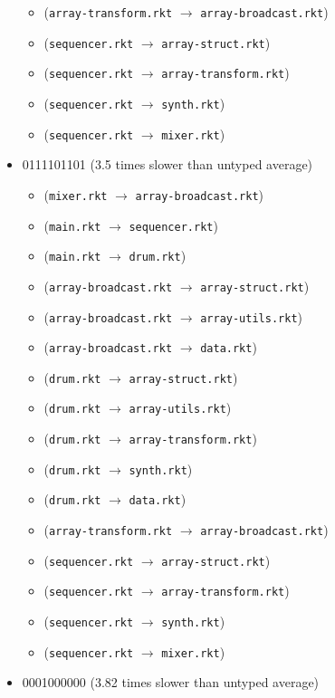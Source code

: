 \documentclass{article}
\newcommand{\mono}[1]{\texttt{#1}}
\begin{document}
\begin{itemize}
\begin{itemize}
  \item (\mono{array-transform.rkt} $\rightarrow$ \mono{array-broadcast.rkt})
  \item (\mono{sequencer.rkt} $\rightarrow$ \mono{array-struct.rkt})
  \item (\mono{sequencer.rkt} $\rightarrow$ \mono{array-transform.rkt})
  \item (\mono{sequencer.rkt} $\rightarrow$ \mono{synth.rkt})
  \item (\mono{sequencer.rkt} $\rightarrow$ \mono{mixer.rkt})
  \end{itemize}
\item 0111101101 (3.5 times slower than untyped average)
  \begin{itemize}
  \item (\mono{mixer.rkt} $\rightarrow$ \mono{array-broadcast.rkt})
  \item (\mono{main.rkt} $\rightarrow$ \mono{sequencer.rkt})
  \item (\mono{main.rkt} $\rightarrow$ \mono{drum.rkt})
  \item (\mono{array-broadcast.rkt} $\rightarrow$ \mono{array-struct.rkt})
  \item (\mono{array-broadcast.rkt} $\rightarrow$ \mono{array-utils.rkt})
  \item (\mono{array-broadcast.rkt} $\rightarrow$ \mono{data.rkt})
  \item (\mono{drum.rkt} $\rightarrow$ \mono{array-struct.rkt})
  \item (\mono{drum.rkt} $\rightarrow$ \mono{array-utils.rkt})
  \item (\mono{drum.rkt} $\rightarrow$ \mono{array-transform.rkt})
  \item (\mono{drum.rkt} $\rightarrow$ \mono{synth.rkt})
  \item (\mono{drum.rkt} $\rightarrow$ \mono{data.rkt})
  \item (\mono{array-transform.rkt} $\rightarrow$ \mono{array-broadcast.rkt})
  \item (\mono{sequencer.rkt} $\rightarrow$ \mono{array-struct.rkt})
  \item (\mono{sequencer.rkt} $\rightarrow$ \mono{array-transform.rkt})
  \item (\mono{sequencer.rkt} $\rightarrow$ \mono{synth.rkt})
  \item (\mono{sequencer.rkt} $\rightarrow$ \mono{mixer.rkt})
  \end{itemize}
\item 0001000000 (3.82 times slower than untyped average)
  \begin{itemize}

\end{itemize}
\end{itemize}
\end{document}
